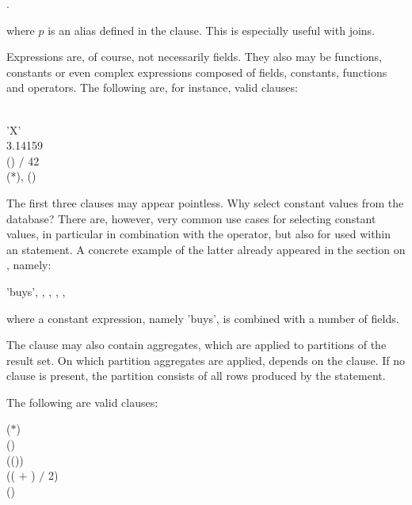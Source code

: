  .

where $p$ is an alias defined in the  clause.
This is especially useful with joins.

Expressions are, of course, not necessarily fields.
They also may be functions, constants or even complex expressions
composed of fields, constants, functions and operators.
The following are, for instance, valid  clauses:

\begin{minipage}{\textwidth}
  \\
 'X' \\
 3.14159 \\
 () $/$ 42 \\
 (*), ()
\end{minipage}

The first three clauses may appear pointless.
Why select constant values from the database?
There are, however, very common use cases
for selecting constant values, in particular
in combination with the  operator,
but also for  used within an
 statement. A concrete example
of the latter already appeared in the section
on , namely:

 'buys', ,
                         , 
                         , 
                         ,

where a constant expression, namely 'buys',
is combined with a number of fields.

The  clause may also contain aggregates,
which are applied to partitions of the result set.
On which partition
aggregates are applied, depends 
on the  clause. If no  clause
is present, the partition consists of all rows produced
by the  statement.

The following are valid  clauses:

 ($\ast$) \\
 () \\
 (()) \\
 (( $+$
                                   ) $/$ 2) \\
 ()

